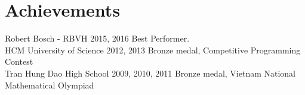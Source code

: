 \section*{Achievements}
{%
  \event
  {Robert Bosch - RBVH}
  {2015, 2016}
  {Best Performer.}
  \\
  \event
  {HCM University of Science}
  {2012, 2013}
  {Bronze medal, Competitive Programming Contest}
  \\
  \event
  {Tran Hung Dao High School}
  {2009, 2010, 2011}
  {Bronze medal, Vietnam National Mathematical Olympiad}
}%
